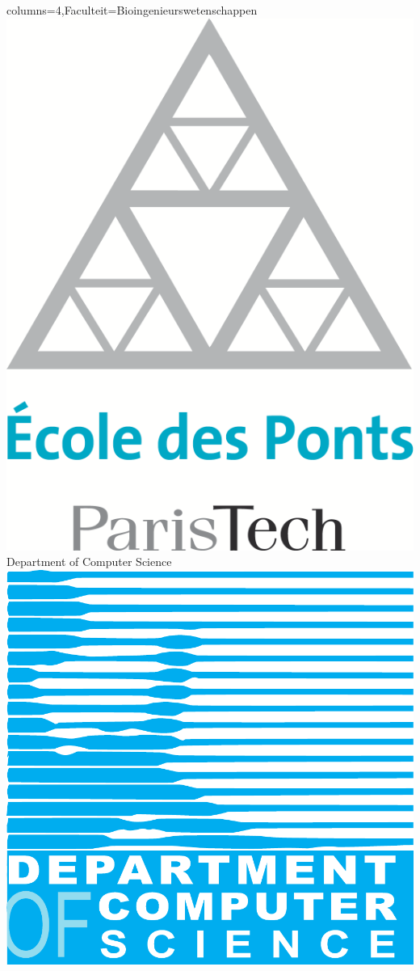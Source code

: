 \documentclass[landscape,a0paper,fontscale=0.45]{kuleuvenposter}
\begin{document}
\begin{poster}{columns=4,Faculteit=Bioingenieurswetenschappen}
{  \includegraphics[height=.8\footerheight]{specific/logo_EcolePonts} %
}
{ %
  Department of Computer Science%
}
{ %
  \includegraphics[height=\footerheight]{images/logo_CS}%
}


\end{poster}
\end{document}
